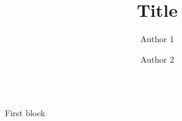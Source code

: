 \documentclass[english,xcolor=table,t
]{beamer}
\title{Title}
\author{Author 1 \and Author 2}
\institute{institute name}
\begin{document}
\begin{frame}

\begin{columns}


\begin{block}{First block}

\end{block}\end{columns}\end{frame}
\end{document}
